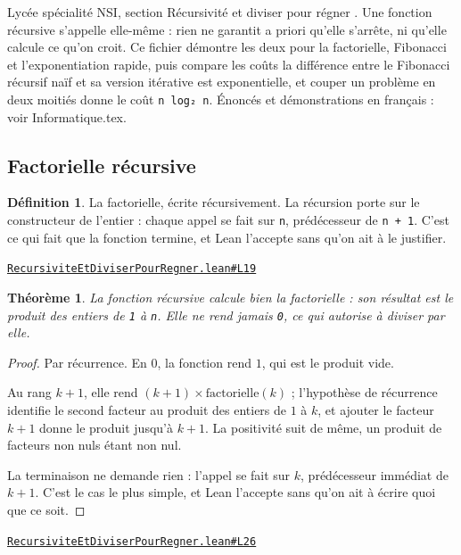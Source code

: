 \documentclass[11pt,a4paper]{article}
\theoremstyle{definition}
\newtheorem{definition}{Définition}
\theoremstyle{plain}
\newtheorem{theoreme}{Théorème}
\newcommand{\source}[2]{\par\smallskip\noindent\hfill{\footnotesize\href{#1}{\texttt{#2}}}\par\smallskip}
\begin{document}
\noindent
Lycée \textemdash{} spécialité NSI, section \og{} Récursivité et diviser pour régner \fg{}.
Une fonction récursive s'appelle elle-même : rien ne garantit a priori qu'elle
s'arrête, ni qu'elle calcule ce qu'on croit. Ce fichier démontre les deux pour la
factorielle, Fibonacci et l'exponentiation rapide, puis compare les coûts \textemdash{} la
différence entre le Fibonacci récursif naïf et sa version itérative est
exponentielle, et couper un problème en deux moitiés donne le coût \texttt{n log₂ n}.
Énoncés et démonstrations en français : voir Informatique.tex.

\subsection{Factorielle récursive}

\begin{definition}
La factorielle, écrite récursivement. La récursion porte sur le constructeur de
l'entier : chaque appel se fait sur \texttt{n}, prédécesseur de \texttt{n + 1}. C'est ce qui fait
que la fonction termine, et Lean l'accepte sans qu'on ait à le justifier.
\end{definition}
\source{https://github.com/Commutator-IO/learn-lean/blob/main/courses/02-lycee/11-informatique-nsi/RecursiviteEtDiviserPourRegner.lean\#L19}{RecursiviteEtDiviserPourRegner.lean\#L19}

\begin{theoreme}
La fonction récursive calcule bien la factorielle : son résultat est le produit
des entiers de \texttt{1} à \texttt{n}. Elle ne rend jamais \texttt{0}, ce qui autorise à diviser par
elle.
\end{theoreme}
\begin{proof}
Par récurrence. En \(0\), la fonction rend \(1\), qui est le produit vide.

Au rang \(k+1\), elle rend \((k+1) \times \mathrm{factorielle}(k)\) ; l'hypothèse de
récurrence identifie le second facteur au produit des entiers de \(1\) à \(k\), et
ajouter le facteur \(k+1\) donne le produit jusqu'à \(k+1\). La positivité suit de même,
un produit de facteurs non nuls étant non nul.

La terminaison ne demande rien : l'appel se fait sur \(k\), prédécesseur immédiat de
\(k+1\). C'est le cas le plus simple, et Lean l'accepte sans qu'on ait à écrire quoi que
ce soit.
\end{proof}
\source{https://github.com/Commutator-IO/learn-lean/blob/main/courses/02-lycee/11-informatique-nsi/RecursiviteEtDiviserPourRegner.lean\#L26}{RecursiviteEtDiviserPourRegner.lean\#L26}
\end{document}
